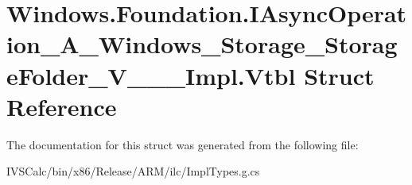 \hypertarget{struct_windows_1_1_foundation_1_1_i_async_operation___a___windows___storage___storage_folder___v_______impl_1_1_vtbl}{}\section{Windows.\+Foundation.\+I\+Async\+Operation\+\_\+\+A\+\_\+\+Windows\+\_\+\+Storage\+\_\+\+Storage\+Folder\+\_\+\+V\+\_\+\+\_\+\+\_\+\+Impl.\+Vtbl Struct Reference}
\label{struct_windows_1_1_foundation_1_1_i_async_operation___a___windows___storage___storage_folder___v_______impl_1_1_vtbl}


The documentation for this struct was generated from the following file\+:\begin{DoxyCompactItemize}
\item 
I\+V\+S\+Calc/bin/x86/\+Release/\+A\+R\+M/ilc/Impl\+Types.\+g.\+cs\end{DoxyCompactItemize}
